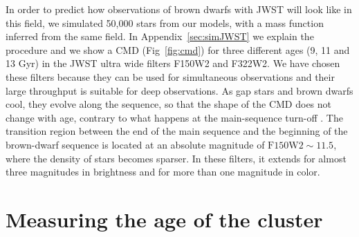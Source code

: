 \documentclass[useAMS,usenatbib]{mnras}
\begin{document}
In order to predict how observations of brown dwarfs with JWST will look like in this field, we simulated 50,000 stars from our models, with a mass function inferred from the same field.  In Appendix~\ref{sec:simJWST} we explain the procedure and we show a CMD (Fig~\ref{fig:cmd}) for three different ages (9, 11 and 13 Gyr) in the JWST ultra wide filters F150W2 and F322W2. We have chosen these filters because they can be used for simultaneous observations and their large throughput is suitable for deep observations. As gap stars and brown dwarfs cool, they evolve along the sequence, so that the shape of the CMD does not change with age, contrary to what happens at the main-sequence turn-off \citep[see also][]{1997A&A...327.1054B}.  The transition region between the end of the main sequence and the beginning of the brown-dwarf sequence is located at an absolute magnitude of $\mathrm{F150W2} \sim 11.5$, where the density of stars becomes sparser. In these filters, it extends for almost three magnitudes in brightness and for more than one magnitude in color.

\section{Measuring the age of the cluster}
\label{sec:method}
\end{document}
